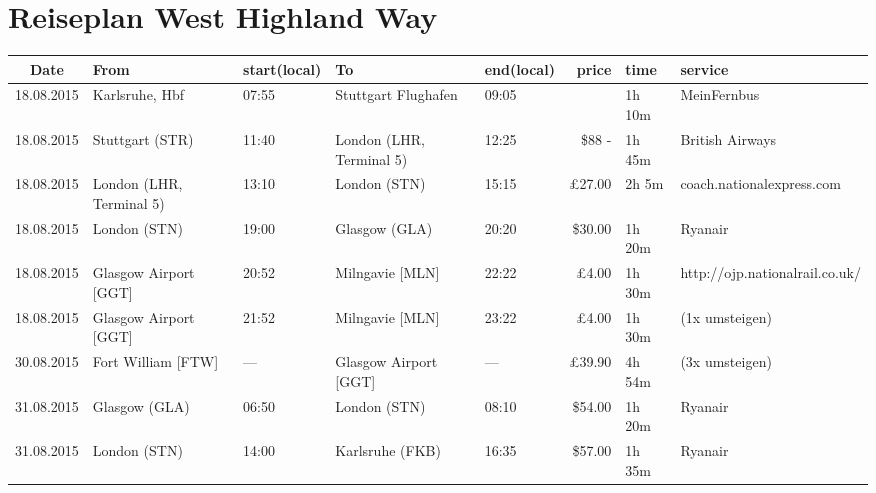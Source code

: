 \documentclass[a4paper, landscape]{scrartcl}
\begin{document}
\clearpage
\section*{Reiseplan West Highland Way}
\vspace*{\fill}
    \begin{table}[ht]
        \centering
        \begin{tabular}{cl p{2cm} l p{2cm} rl p{5cm}}
        \toprule
    \textbf{Date}  & \textbf{From}              & \textbf{start\newline (local)} & \textbf{To} & \textbf{end\newline (local)} & \textbf{price} & \textbf{time} & \textbf{service} \\ \midrule
    18.08.2015 & Karlsruhe, Hbf           & 07:55          & Stuttgart Flughafen      & 09:05        & \EUR 5.00      & 1h 10m & MeinFernbus      \\
    18.08.2015 & Stuttgart (STR)          & 11:40          & London (LHR, Terminal 5) & 12:25        & \$88 - \EUR 100.00 & 1h 45m & British Airways \\
    18.08.2015 & London (LHR, Terminal 5) & 13:10          & London (STN)             & 15:15        &   £27.00       & 2h 5m  & coach.nationalexpress.com           \\
    18.08.2015 & London (STN)             & 19:00          & Glasgow (GLA)            & 20:20        &  \$30.00       & 1h 20m & Ryanair                             \\
    18.08.2015 & Glasgow Airport [GGT]    & 20:52          & Milngavie [MLN]          & 22:22        &    £4.00       & 1h 30m & http://ojp.nationalrail.co.uk/      \\
    18.08.2015 & Glasgow Airport [GGT]    & 21:52          & Milngavie [MLN]          & 23:22        &    £4.00       & 1h 30m & (1x umsteigen)                      \\ \hline
    30.08.2015 & Fort William [FTW]       & ---            & Glasgow Airport [GGT]    & ---          &   £39.90       & 4h 54m & (3x umsteigen)                      \\
    31.08.2015 & Glasgow (GLA)            & 06:50          & London (STN)             & 08:10        &  \$54.00       & 1h 20m & Ryanair                             \\
    31.08.2015 & London (STN)             & 14:00          & Karlsruhe (FKB)          & 16:35        &  \$57.00       & 1h 35m & Ryanair                             \\\midrule

\end{tabular}
\end{table}
\end{document}
